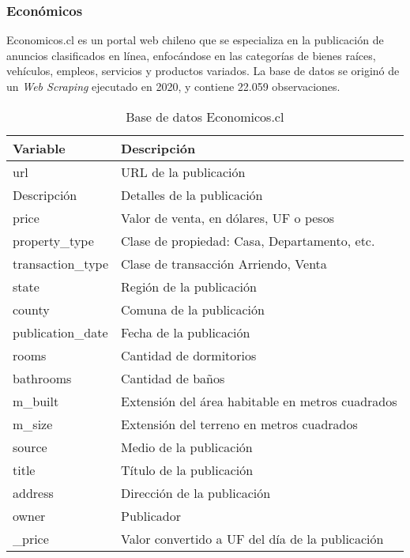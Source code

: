 \subsubsection{Económicos}
Economicos.cl es un portal web chileno que se especializa en la publicación de anuncios clasificados en línea, enfocándose en las categorías de bienes raíces, vehículos, empleos, servicios y productos variados. 
La base de datos se originó de un \emph{Web Scraping} ejecutado en 2020, y contiene 22.059 observaciones.

\begin{table}[H]
	\centering
	\caption{Base de datos Economicos.cl}
	\label{data-economicos}
    \begin{tabular}{|l|m{30em}|}
        \hline
        \rowcolor[gray]{0.8}
        Variable & Descripción \\
        \hline
        url & URL de la publicación \\
        \hline
        Descripción & Detalles de la publicación \\
        \hline
        price & Valor de venta, en dólares, UF o pesos \\
        \hline
        property\_type & Clase de propiedad: Casa, Departamento, etc. \\
        \hline
        transaction\_type & Clase de transacción\: Arriendo, Venta \\
        \hline
        state & Región de la publicación \\
        \hline
        county & Comuna de la publicación \\
        \hline
        publication\_date & Fecha de la publicación \\
        \hline
        rooms & Cantidad de dormitorios \\
        \hline
        bathrooms & Cantidad de baños \\
        \hline
        m\_built & Extensión del área habitable en metros cuadrados \\
        \hline
        m\_size & Extensión del terreno en metros cuadrados \\
        \hline
        source & Medio de la publicación \\
        \hline
        title & Título de la publicación \\
        \hline
        address & Dirección de la publicación \\
        \hline
        owner & Publicador \\
        \hline
        \_price & Valor convertido a UF del día de la publicación \\
        \hline
    \end{tabular}
\end{table}




